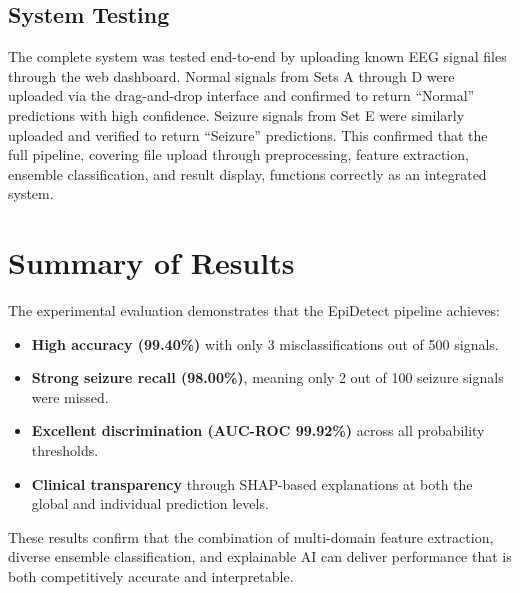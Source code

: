 \subsection{System Testing}

The complete system was tested end-to-end by uploading known EEG signal files through the web dashboard. Normal signals from Sets A through D were uploaded via the drag-and-drop interface and confirmed to return ``Normal'' predictions with high confidence. Seizure signals from Set E were similarly uploaded and verified to return ``Seizure'' predictions. This confirmed that the full pipeline, covering file upload through preprocessing, feature extraction, ensemble classification, and result display, functions correctly as an integrated system.

\section{Summary of Results}

The experimental evaluation demonstrates that the EpiDetect pipeline achieves:

\begin{itemize}
    \item \textbf{High accuracy (99.40\%)} with only 3 misclassifications out of 500 signals.
    \item \textbf{Strong seizure recall (98.00\%)}, meaning only 2 out of 100 seizure signals were missed.
    \item \textbf{Excellent discrimination (AUC-ROC 99.92\%)} across all probability thresholds.
    \item \textbf{Clinical transparency} through SHAP-based explanations at both the global and individual prediction levels.
\end{itemize}

These results confirm that the combination of multi-domain feature extraction, diverse ensemble classification, and explainable AI can deliver performance that is both competitively accurate and interpretable.
